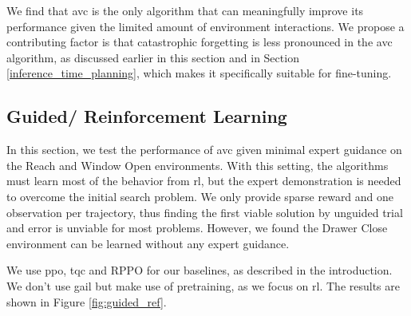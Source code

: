 We find that \ac{avc} is the only algorithm that can meaningfully improve its performance given the limited amount of environment interactions. 
We propose a contributing factor is that catastrophic forgetting is less pronounced in the \ac{avc} algorithm, as discussed earlier in this section and in Section \ref{inference_time_planning}, 
which makes it specifically suitable for fine-tuning.



\subsection{Guided/ Reinforcement Learning}
\label{sec:g_ref_ler}
In this section, we test the performance of \ac{avc} given minimal expert guidance on the Reach and Window Open environments.
With this setting, the algorithms must learn most of the behavior from \ac{rl}, but the expert
demonstration is needed to overcome the initial search problem. We only provide sparse reward and one observation per trajectory, thus finding the first viable solution by unguided
trial and error is unviable for most problems. However, we found the Drawer Close environment can be learned without any expert guidance.

We use \ac{ppo}, \ac{tqc} and RPPO for our baselines, as described in the introduction. We don't use \ac{gail} but make use of pretraining, as we focus on \ac{rl}. The results
are shown in Figure \ref{fig:guided_ref}.

